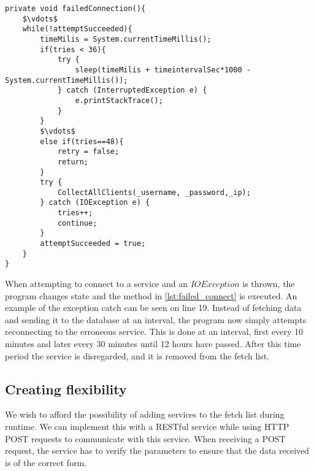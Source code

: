 \begin{lstlisting}[caption={Failed Connection snapshot},label={lst:failed_connect},language=inc_Java, mathescape]
private void failedConnection(){
	$\vdots$
    while(!attemptSucceeded){
        timeMilis = System.currentTimeMillis();
        if(tries < 36){
            try {
                sleep(timeMilis + timeintervalSec*1000 - System.currentTimeMillis());
            } catch (InterruptedException e) {
                e.printStackTrace();
            }
        }
        $\vdots$
        else if(tries==48){
        	retry = false;
            return;
        }
        try {
            CollectAllClients(_username, _password,_ip);
        } catch (IOException e) {
            tries++;
            continue;
        }
        attemptSucceeded = true;
    }
}
\end{lstlisting}

When attempting to connect to a service and an $IOException$ is thrown, the program changes state and the method in \cref{lst:failed_connect} is executed. An example of the exception catch can be seen on line 19. Instead of fetching data and sending it to the database at an interval, the program now simply attempts reconnecting to the erroneous service. This is done at an interval, first every 10 minutes and later every 30 minutes until 12 hours have passed. After this time period the service is disregarded, and it is removed from the fetch list.

\subsection{Creating flexibility}
We wish to afford the possibility of adding services to the fetch list during runtime. We can implement this with a RESTful service while using HTTP POST requests to communicate with this service. When receiving a POST request, the service has to verify the parameters to ensure that the data received is of the correct form. 

